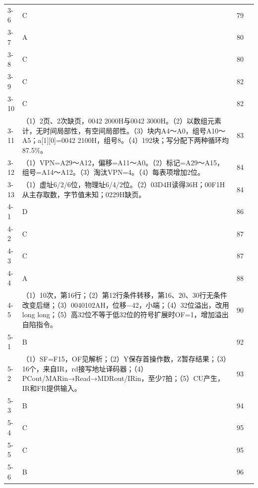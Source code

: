 \documentclass{sidenotes-simplex}
\begin{document}
{\begin{longtable}{@{}p{18mm}p{87mm}p{20mm}p{20mm}@{}}
3-6 & C & 79 & \hyperref[a:CO03-E06]{\pageref*{a:CO03-E06}} \\
3-7 & A & 80 & \hyperref[a:CO03-E07]{\pageref*{a:CO03-E07}} \\
3-8 & C & 80 & \hyperref[a:CO03-E08]{\pageref*{a:CO03-E08}} \\
3-9 & C & 82 & \hyperref[a:CO03-E09]{\pageref*{a:CO03-E09}} \\
3-10 & C & 82 & \hyperref[a:CO03-E10]{\pageref*{a:CO03-E10}} \\
3-11 & （1）2页、2次缺页，0042 2000H与0042 3000H。（2）以数组元素计，无时间局部性，有空间局部性。（3）块内A4～A0，组号A10～A5；a{[}1{]}{[}0{]}=0042 2100H，组号8。（4）192块；写分配下两种循环均87.5\%。 & 83 & \hyperref[a:CO03-E11]{\pageref*{a:CO03-E11}} \\
3-12 & （1）VPN=A29～A12，偏移=A11～A0。（2）标记=A29～A15，组号=A14～A12。（3）淘汰VPN=4。（4）每表项增加2位。 & 84 & \hyperref[a:CO03-E12]{\pageref*{a:CO03-E12}} \\
3-13 & （1）虚址6/2/6位，物理址6/4/2位。（2）03D4H读得36H；00F1H从主存取数，字节值未知；0229H缺页。 & 84 & \hyperref[a:CO03-E13]{\pageref*{a:CO03-E13}} \\
4-1 & D & 86 & \hyperref[a:CO04-E01]{\pageref*{a:CO04-E01}} \\
4-2 & C & 87 & \hyperref[a:CO04-E02]{\pageref*{a:CO04-E02}} \\
4-3 & C & 87 & \hyperref[a:CO04-E03]{\pageref*{a:CO04-E03}} \\
4-4 & A & 88 & \hyperref[a:CO04-E04]{\pageref*{a:CO04-E04}} \\
4-5 & （1）10次，第16行；（2）第12行条件转移，第16、20、30行无条件改变后继；（3）0040102AH，位移−42，小端；（4）32位溢出，改用long long；（5）高32位不等于低32位的符号扩展时OF=1，增加溢出自陷指令。 & 90 & \hyperref[a:CO04-E05]{\pageref*{a:CO04-E05}} \\
5-1 & B & 92 & \hyperref[a:CO05-E01]{\pageref*{a:CO05-E01}} \\
5-2 & （1）SF=F15，OF见解析；（2）Y保存首操作数，Z暂存结果；（3）16个，来自IR，rd接写地址译码器；（4）PCout/MARin→Read→MDRout/IRin，至少7拍；（5）CU产生，IR和FR提供输入。 & 93 & \hyperref[a:CO05-E02]{\pageref*{a:CO05-E02}} \\
5-3 & B & 94 & \hyperref[a:CO05-E03]{\pageref*{a:CO05-E03}} \\
5-4 & C & 95 & \hyperref[a:CO05-E04]{\pageref*{a:CO05-E04}} \\
5-5 & C & 95 & \hyperref[a:CO05-E05]{\pageref*{a:CO05-E05}} \\
5-6 & B & 96 & \hyperref[a:CO05-E06]{\pageref*{a:CO05-E06}} \\

\end{longtable}}
\end{document}
